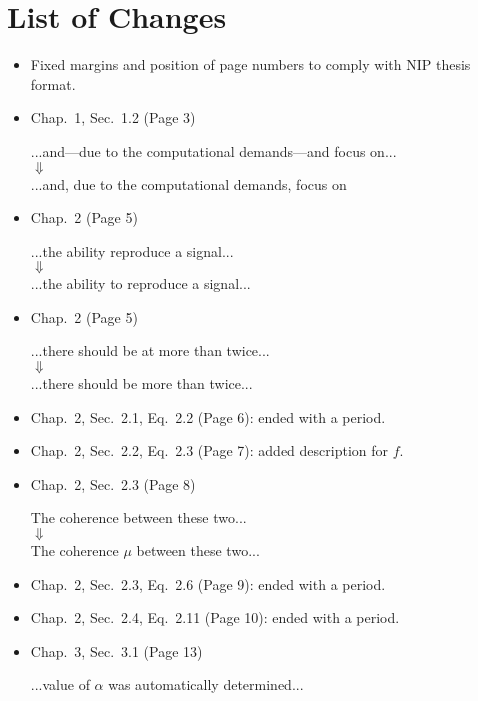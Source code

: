 \documentclass{report}
\begin{document}
	\section*{List of Changes}
	
	\begin{itemize}
		\item Fixed margins and position of page numbers to comply with NIP thesis format.
		\item Chap.~1, Sec.~1.2 (Page 3)
		\begin{center}
			...and---due to the computational demands---and focus on... \\
			$\Downarrow$ \\
			...and, due to the computational demands, focus on
		\end{center}
		
		\item Chap.~2 (Page 5)
		\begin{center}
			...the ability reproduce a signal... \\
			$\Downarrow$ \\
			...the ability to reproduce a signal...
		\end{center}
		\item Chap.~2 (Page 5)
		\begin{center}
			...there should be at more than twice... \\
			$\Downarrow$ \\
			...there should be more than twice...
		\end{center}
		\item Chap.~2, Sec.~2.1, Eq.~2.2 (Page 6): ended with a period.
		\item Chap.~2, Sec.~2.2, Eq.~2.3 (Page 7): added description for $f$.
		\item Chap.~2, Sec.~2.3 (Page 8)
		\begin{center}
			The coherence between these two... \\
			$\Downarrow$ \\
			The coherence $\mu$ between these two...
		\end{center}
		\item Chap.~2, Sec.~2.3, Eq.~2.6 (Page 9): ended with a period.
		\item Chap.~2, Sec.~2.4, Eq.~2.11 (Page 10): ended with a period.
		\item Chap.~3, Sec.~3.1 (Page 13)
			\begin{center}
				...value of $\alpha$ was automatically determined... \\

\end{center}
\end{itemize}
\end{document}
